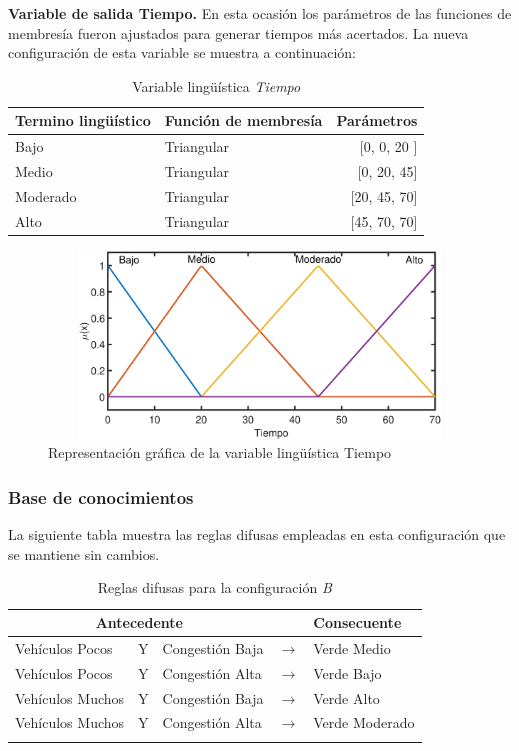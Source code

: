 \pagebreak
\textbf{Variable de salida Tiempo.}
En esta ocasión los parámetros de las funciones de membresía fueron ajustados para generar tiempos más acertados. La nueva configuración de esta variable se muestra a continuación:


\begin{table}[!h]
	\centering
	\begin{tabular}{llr} \toprule
		Termino lingüístico & Función de membresía & Parámetros \\ \midrule
		Bajo & Triangular & [0, 0, 20 ] \\
		Medio & Triangular & [0, 20, 45] \\
		Moderado & Triangular & [20, 45, 70] \\
		Alto & Triangular & [45, 70, 70] \\ \bottomrule
	\end{tabular}
	\caption{Variable lingüística \textit{Tiempo}}
\end{table}

\begin{figure}[H]
	\centering
	\includegraphics[height=5cm, width=12cm]{Variables/ConfigB_output1.eps}
	\caption[Gráfica variable lingüística tiempo - B]{Representación gráfica de la variable lingüística Tiempo}
\end{figure}

\subsubsection{Base de conocimientos}
La siguiente tabla muestra las reglas difusas empleadas en esta configuración que se mantiene sin cambios.
\begin{longtable}[c]{lclcl} \toprule
	\multicolumn{3}{c}{Antecedente} & & Consecuente \\ \midrule
	Vehículos Pocos & Y & Congestión Baja& $\rightarrow$ & Verde Medio \\
	Vehículos Pocos & Y & Congestión Alta& $\rightarrow$ & Verde Bajo \\
	Vehículos Muchos &Y& Congestión Baja& $\rightarrow$ & Verde Alto \\
	Vehículos Muchos &Y& Congestión Alta& $\rightarrow$ & Verde Moderado \\ \hline
	\caption{Reglas difusas para la configuración \textit{B}}
\end{longtable}

